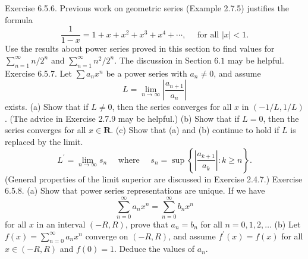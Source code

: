 \begin{solution}
\end{solution}

Exercise 6.5.6. Previous work on geometric series (Example 2.7.5) justifies the formula
$$
\frac{1}{1-x}=1+x+x^{2}+x^{3}+x^{4}+\cdots, \quad \text { for all }|x|<1 .
$$
Use the results about power series proved in this section to find values for $\sum_{n=1}^{\infty} n / 2^{n}$ and $\sum_{n=1}^{\infty} n^{2} / 2^{n}$. The discussion in Section $6.1$ may be helpful.
Exercise 6.5.7. Let $\sum a_{n} x^{n}$ be a power series with $a_{n} \neq 0$, and assume
$$
L=\lim _{n \rightarrow \infty}\left|\frac{a_{n+1}}{a_{n}}\right|
$$
exists.
(a) Show that if $L \neq 0$, then the series converges for all $x$ in $(-1 / L, 1 / L)$. (The advice in Exercise 2.7.9 may be helpful.)
(b) Show that if $L=0$, then the series converges for all $x \in \mathbf{R}$.
(c) Show that (a) and (b) continue to hold if $L$ is replaced by the limit.
$$
L^{\prime}=\lim _{n \rightarrow \infty} s_{n} \quad \text { where } \quad s_{n}=\sup \left\{\left|\frac{a_{k+1}}{a_{k}}\right|: k \geq n\right\} .
$$
(General properties of the limit superior are discussed in Exercise 2.4.7.)
Exercise 6.5.8. (a) Show that power series representations are unique. If we have
$$
\sum_{n=0}^{\infty} a_{n} x^{n}=\sum_{n=0}^{\infty} b_{n} x^{n}
$$
for all $x$ in an interval $(-R, R)$, prove that $a_{n}=b_{n}$ for all $n=0,1,2, \ldots$
(b) Let $f(x)=\sum_{n=0}^{\infty} a_{n} x^{n}$ converge on $(-R, R)$, and assume $f^{\prime}(x)=f(x)$ for all $x \in(-R, R)$ and $f(0)=1$. Deduce the values of $a_{n}$.

